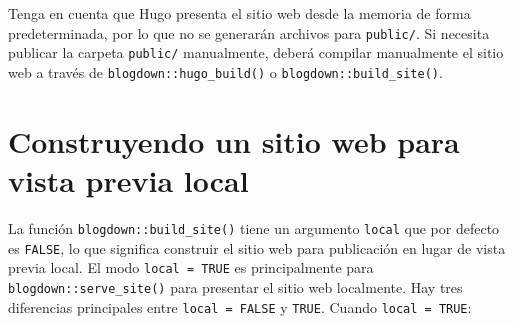\documentclass[12pt,]{krantz}
\theoremstyle{definition}
\theoremstyle{definition}
\theoremstyle{definition}
\theoremstyle{remark}
\begin{document}
Tenga en cuenta que Hugo presenta el sitio web desde la memoria de forma
predeterminada, por lo que no se generarán archivos para
\texttt{public/}. Si necesita publicar la carpeta \texttt{public/}
manualmente, deberá compilar manualmente el sitio web a través de
\texttt{blogdown::hugo\_build()} o \texttt{blogdown::build\_site()}.

\hypertarget{local-preview}{%
\section{Construyendo un sitio web para vista previa
local}\label{local-preview}}

La función
\texttt{blogdown::build\_site()} tiene un argumento \texttt{local} que
por defecto es \texttt{FALSE}, lo que significa construir el sitio web
para publicación en lugar de vista previa local. El modo
\texttt{local\ =\ TRUE} es principalmente para
\texttt{blogdown::serve\_site()} para presentar el sitio web localmente.
Hay tres diferencias principales entre \texttt{local\ =\ FALSE} y
\texttt{TRUE}. Cuando \texttt{local\ =\ TRUE}:
\end{document}
